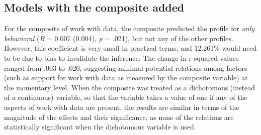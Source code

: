 \documentclass[]{book}
\theoremstyle{definition}
\theoremstyle{definition}
\theoremstyle{definition}
\theoremstyle{remark}
\begin{document}
\subsection{Models with the composite
added}\label{models-with-the-composite-added}

For the composite of work with data, the composite predicted the profile
for \emph{only behavioral} (\emph{B} = 0.007 (0.004), \emph{p} = .021),
but not any of the other profiles. However, this coefficient is very
small in practical terms, and 12.261\% would need to be due to bias to
invalidate the inference. The change in r-squared values ranged from
.003 to .020, suggesting minimal potential relations among factors (such
as support for work with data as measured by the composite variable) at
the momentary level. When the composite was treated as a dichotomous
(instead of a continuous) variable, so that the variable takes a value
of one if any of the aspects of work with data are present, the results
are similar in terms of the magnitude of the effects and their
significance, as none of the relations are statistically significant
when the dichotomous variable is used.

\begin{landscape}\begin{table}

\caption{\label{tab:just-composite-red}Results of mixed effects models for the composite}
\centering
{}
\end{table}
\end{landscape}
\end{document}
